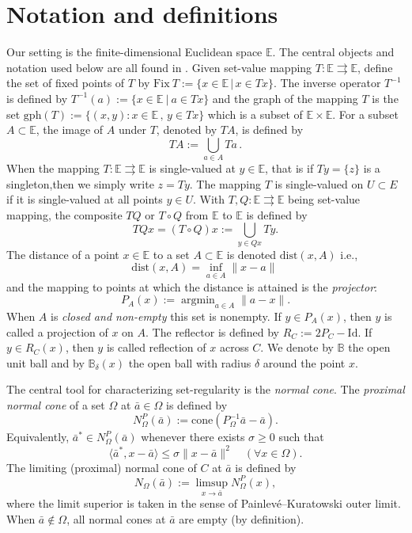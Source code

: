 \documentclass[12pt]{article}
\theoremstyle{definition}
\DeclareMathOperator{\argmin}{argmin}
\newcommand{\B}{\mathbb{B}}
\newcommand{\Ebb}{\mathbb{E}}
\newcommand{\dist}{\mathrm{dist}}
\newcommand{\Id}{\mathrm{Id}}
\newcommand{\gph}{\mathrm{gph} }
\newcommand{\Fix}{\mathrm{Fix}\ }
\begin{document}
\section{Notation and definitions}\label{s:notation}
Our setting is the finite-dimensional Euclidean space $\mathbb E$.  The central objects and notation used below are all found in 
\cite{rt1998wets}.  
Given set-value mapping $T:\Ebb \rightrightarrows \Ebb$, define the set of fixed points of $T$ by
$    \Fix T:=\{x\in \Ebb\,|\, x\in Tx\}.
$
The inverse operator $T^{-1}$ is defined by
$    T^{-1} (a) := \{x \in \Ebb \ | \ a \in T x \}
$
and the graph of the mapping $T$ is the set
$
    \gph (T):=\{(x,y):x\in \Ebb\,,\,y\in Tx\}
$
which is a subset of $\Ebb\times \Ebb$. 
For a subset $A\subset\Ebb$, the image of $A$ under $T$, denoted by $TA$, is defined by
\begin{equation*}
    T A:=\bigcup_{a\in A} Ta\,.
\end{equation*}
When the mapping $T:\Ebb \rightrightarrows \Ebb$ is single-valued at $y\in \Ebb$, that is if $Ty = \{z\}$ is a singleton,then
we simply write $z=Ty$.
The mapping $T$ is single-valued on $U\subset E$ if it is single-valued at all points $y\in U$.
With $T,Q:\Ebb \rightrightarrows \Ebb$ being set-value mapping, the composite $TQ$ or $T\circ Q$ from $\Ebb$ to $\Ebb$ is defined by
\begin{equation*}
    TQx= (T\circ Q)x:= \bigcup_{y\in Qx} Ty.
\end{equation*}
The distance of a point $x\in \Ebb$ to a set $A\subset \Ebb$ is denoted
$\dist(x, A)$ i.e.,
\begin{equation*}
    \dist(x, A)=\inf_{a\in A}\|x-a\|\,
\end{equation*}
and the mapping to points at which the distance is attained is the {\em projector}:
\begin{equation*}
    P_A (x) := \argmin_{a\in A} \|a - x\|.
\end{equation*}
When $A$ is {\em closed and non-empty} this set is nonempty. 
If $y \in  P_A (x)$, then $y$ is called a projection of $x$ on $A$. 
The reflector is defined by $R_ C:= 2P _C - \Id$. If $y\in R_C(x)$, then $y$ is called reflection of $x$ across $C$. We denote by $\mathbb{B}$ the open unit ball and by $\B_\delta(x)$ the open
ball with radius $\delta$ around the point $x$.

The central tool for characterizing set-regularity is the {\em normal cone}.   
The {\em proximal normal cone} of a set $\Omega$ at $\bar{a}\in \Omega$ is defined by
		 	$$ N^P_\Omega(\bar{a}) := \mbox{cone}\left(P^{-1}_\Omega\bar{a}-\bar{a}\right).$$
        	Equivalently, $\bar{a}^*\in N^P_\Omega(\bar{a})$ whenever there exists $\sigma\geq 0$ such that
			$$\langle \bar{a}^*,x-\bar{a}\rangle\leq \sigma\|x-\bar{a}\|^2 \quad(\forall x\in \Omega).$$
The limiting (proximal) normal cone of $C$ at $\bar{a}$ is defined by
			$$ N_{\Omega}(\bar{a}) := \limsup\limits_{x\to\bar{a}}N_{\Omega}^{P}(x), $$
			where the limit superior is taken in the sense of Painlev\'e--Kuratowski outer limit.
 	 When $\bar{a}\not\in \Omega$, all normal cones at $\bar{a}$ are empty (by definition).
\end{document}
